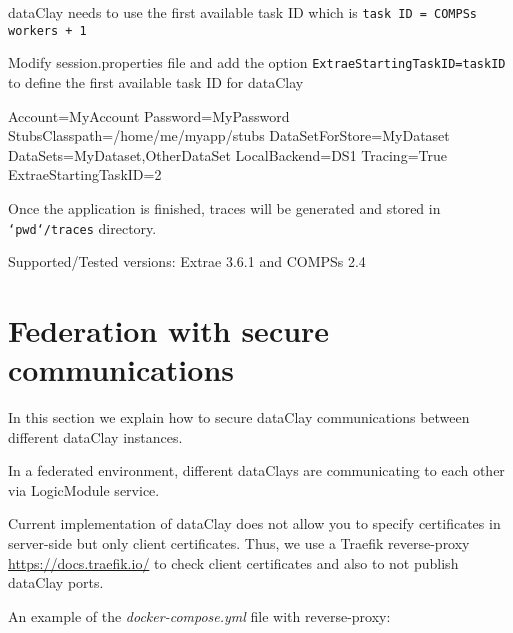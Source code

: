 dataClay needs to use the first available task ID which is \texttt{task ID = COMPSs workers + 1}

Modify session.properties file and add the option \texttt{ExtraeStartingTaskID=taskID} to define the first available task ID for dataClay

\begin{tBox}
 \begin{bash}
  Account=MyAccount
  Password=MyPassword
  StubsClasspath=/home/me/myapp/stubs
  DataSetForStore=MyDataset
  DataSets=MyDataset,OtherDataSet
  LocalBackend=DS1
  Tracing=True
  ExtraeStartingTaskID=2
 \end{bash}
\end{tBox}

Once the application is finished, traces will be generated and stored in \texttt{`pwd`/traces} directory. 

Supported/Tested versions: Extrae 3.6.1 and COMPSs 2.4

\section{Federation with secure communications}

In this section we explain how to secure dataClay communications between different dataClay instances.

In a federated environment, different dataClays are communicating to each other via LogicModule service. 

Current implementation of dataClay does not allow you to specify certificates in server-side but only client certificates. 
Thus, we use a Traefik reverse-proxy \href {https://docs.traefik.io/} {https://docs.traefik.io/} 
to check client certificates and also to not publish dataClay ports. 

An example of the \textit{docker-compose.yml} file with reverse-proxy:


